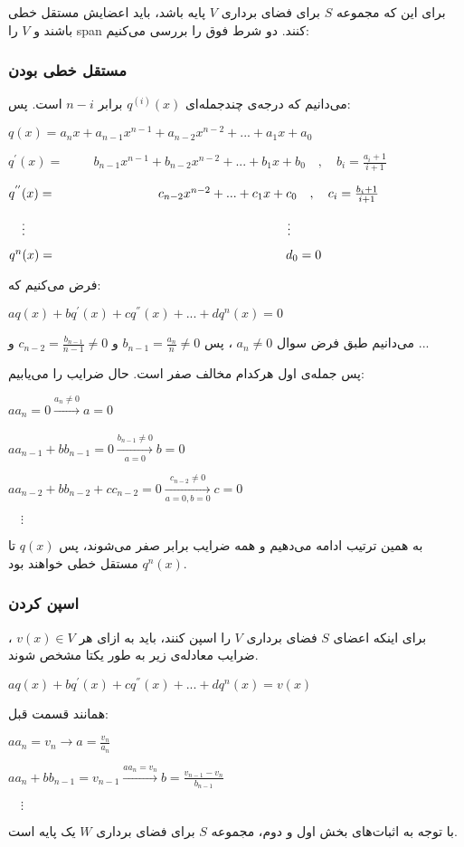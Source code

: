 برای این که مجموعه 
$S$
برای فضای برداری
$V$
پایه باشد، باید اعضایش مستقل خطی باشند و 
$V$
را span کنند.
دو شرط فوق را بررسی می‌کنیم:

\subsubsection*{مستقل خطی بودن}

می‌دانیم که درجه‌ی چندجمله‌ای 
$q^{(i)}(x)$
برابر
$n-i$
است. پس:

\setLTR
$q(x)=a_{n}x+a_{n-1}x^{n-1}+a_{n-2}x^{n-2}+...+a_{1}x+a_{0}$

$q^{'}(x)= \hspace{1cm} b_{n-1}x^{n-1}+b_{n-2}x^{n-2}+...+b_{1}x+b_{0} \quad,\quad b_{i}=\frac{a_{i}+1}{i+1}
$

$q^{''}(x)= \hspace{2.85cm} c_{n-2}x^{n-2}+...+c_{1}x+c_{0} \quad,\quad c_{i}=\frac{b_{i}+1}{i+1}
$

$\quad \vdots  \hspace{7.3cm} \vdots $

$q^{n}(x)= \hspace{6.4cm} d_{0} =0
$
\setRTL

فرض می‌کنیم که:

\setLTR
$aq(x)+bq^{'}(x)+cq^{''}(x)+...+dq^{n}(x)=0$
\setRTL

می‌دانیم طبق فرض سوال 
$a_{n}\neq0$
، پس 
$b_{n-1}=\frac{a_{n}}{n}\neq0$
و 
$c_{n-2}=\frac{b_{n-1}}{n-1}\neq0$
و ...

پس جمله‌ی اول هرکدام مخالف صفر است. حال ضرایب را می‌یابیم:

\setLTR
$aa_{n}=0\xrightarrow[]{a_{n}\neq0} a=0$

$aa_{n-1}+bb_{n-1}=0\xrightarrow[a=0]{b_{n-1}\neq0} b=0$

$aa_{n-2}+bb_{n-2}+cc_{n-2}=0\xrightarrow[a=0,b=0]{c_{n-2}\neq0} c=0$

$\quad \vdots    $
\setRTL

به همین ترتیب ادامه می‌دهیم و همه ضرایب برابر صفر می‌شوند، پس 
$q(x)$
تا 
$q^{n}(x)$
مستقل خطی خواهند بود.

\subsubsection*{اسپن کردن}

برای اینکه اعضای 
$S$
فضای برداری 
$V$
را اسپن کنند، باید به ازای هر 
$v(x) \in V$
، ضرایب معادله‌ی زیر به طور یکتا مشخص شوند.

\setLTR
$aq(x)+bq^{'}(x)+cq^{''}(x)+...+dq^{n}(x)=v(x)$
\setRTL

همانند قسمت قبل:

\setLTR
$aa_{n}=v_{n}\rightarrow a=\frac{v_{n}}{a_{n}}$

$aa_{n}+bb_{n-1}=v_{n-1} \xrightarrow[]{aa_{n}=v_{n}} b = \frac{v_{n-1}-v_{n}}{b_{n-1}}$

$\quad \vdots  $
\setRTL

با توجه به اثبات‌های بخش اول و دوم، مجموعه 
$S$
برای فضای برداری 
$W$
یک پایه است.